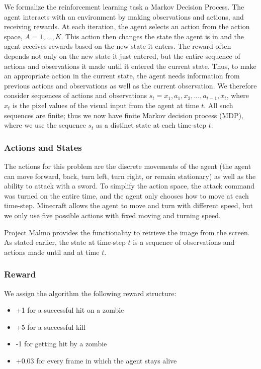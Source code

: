 \documentclass{article}
\begin{document}
\begin{multicols}{2}
We formalize the reinforcement learning task a Markov Decision Process.
The agent interacts with an environment by making observations and actions, and receiving rewards.
At each iteration, the agent selects an action from the action space, $A = {1, \dots , K }$.
This action then changes the state the agent is in and the agent receives rewards based on the new state it enters.
The reward often depends not only on the new state it just entered, but the entire sequence of actions and observations it made until it entered the current state.
Thus, to make an appropriate action in the current state, the agent needs information from previous actions and observations as well as the current observation.
We therefore consider sequences of actions and observations $s_t = x_1, a_1, x_2, ..., a_{t-1}, x_t$, where $x_t$ is the pixel values of the visual input from the agent at time $t$.
All such sequences are finite; thus we now have finite Markov decision process (MDP), where we use the sequence $s_t$ as a distinct state at each time-step $t$.

\subsubsection{Actions and States}

The actions for this problem are the discrete movements of the agent (the agent can move forward, back, turn left, turn right, or remain stationary) as well as the ability to attack with a sword. To simplify the action space, the attack command was turned on the entire time, and the agent only chooses how to move at each time-step. Minecraft allows the agent to move and turn with different speed, but we only use five possible actions with fixed moving and turning speed.

Project Malmo provides the functionality to retrieve the image from the screen.
As stated earlier, the state at time-step $t$ is a sequence of observations and actions made until and at time $t$.


\subsubsection{Reward}

We assign the algorithm the following reward structure:
\begin{itemize}
    \item +1 for a successful hit on a zombie
    \item +5 for a successful kill
    \item -1 for getting hit by a zombie
    \item +0.03 for every frame in which the agent stays alive
\end{itemize}


\end{multicols}
\end{document}

